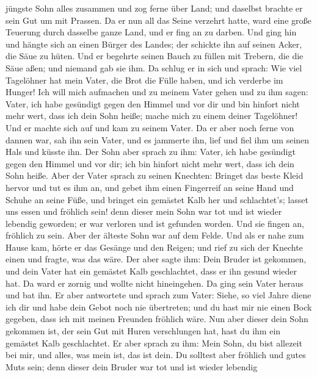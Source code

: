 jüngste Sohn alles zusammen und zog ferne über Land; und daselbst
brachte er sein Gut um mit Prassen.  Da er nun all das
Seine verzehrt hatte, ward eine große Teuerung durch dasselbe ganze
Land, und er fing an zu darben.  Und ging hin und hängte
sich an einen Bürger des Landes; der schickte ihn auf seinen Acker, die
Säue zu hüten.  Und er begehrte seinen Bauch zu füllen mit
Trebern, die die Säue aßen; und niemand gab sie ihm.  Da
schlug er in sich und sprach: Wie viel Tagelöhner hat mein Vater, die
Brot die Fülle haben, und ich verderbe im Hunger!  Ich will
mich aufmachen und zu meinem Vater gehen und zu ihm sagen: Vater, ich
habe gesündigt gegen den Himmel und vor dir  und bin
hinfort nicht mehr wert, dass ich dein Sohn heiße; mache mich zu einem
deiner Tagelöhner!  Und er machte sich auf und kam zu
seinem Vater. Da er aber noch ferne von dannen war, sah ihn sein Vater,
und es jammerte ihn, lief und fiel ihm um seinen Hals und küsste ihn.
 Der Sohn aber sprach zu ihm: Vater, ich habe gesündigt
gegen den Himmel und vor dir; ich bin hinfort nicht mehr wert, dass ich
dein Sohn heiße.  Aber der Vater sprach zu seinen Knechten:
Bringet das beste Kleid hervor und tut es ihm an, und gebet ihm einen
Fingerreif an seine Hand und Schuhe an seine Füße,  und
bringet ein gemästet Kalb her und schlachtet's; lasset uns essen und
fröhlich sein!  denn dieser mein Sohn war tot und ist
wieder lebendig geworden; er war verloren und ist gefunden worden. Und
sie fingen an, fröhlich zu sein.  Aber der älteste Sohn war
auf dem Felde. Und als er nahe zum Hause kam, hörte er das Gesänge und
den Reigen;  und rief zu sich der Knechte einen und fragte,
was das wäre.  Der aber sagte ihm: Dein Bruder ist
gekommen, und dein Vater hat ein gemästet Kalb geschlachtet, dass er ihn
gesund wieder hat.  Da ward er zornig und wollte nicht
hineingehen. Da ging sein Vater heraus und bat ihn.  Er
aber antwortete und sprach zum Vater: Siehe, so viel Jahre diene ich dir
und habe dein Gebot noch nie übertreten; und du hast mir nie einen Bock
gegeben, dass ich mit meinen Freunden fröhlich wäre.  Nun
aber dieser dein Sohn gekommen ist, der sein Gut mit Huren verschlungen
hat, hast du ihm ein gemästet Kalb geschlachtet.  Er aber
sprach zu ihm: Mein Sohn, du bist allezeit bei mir, und alles, was mein
ist, das ist dein.  Du solltest aber fröhlich und gutes
Muts sein; denn dieser dein Bruder war tot und ist wieder lebendig

